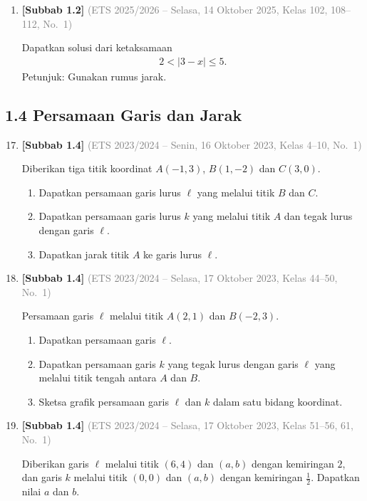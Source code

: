 \documentclass[10pt,openany,a4paper]{article}
\theoremstyle{definition}
\theoremstyle{definition}
\theoremstyle{plain}
\begin{document}
\begin{enumerate}
    \item \textbf{[Subbab 1.2]} {\footnotesize\textcolor{gray}{(ETS 2025/2026 -- Selasa, 14 Oktober 2025, Kelas 102, 108--112, No.~1)}}\par
    Dapatkan solusi dari ketaksamaan
    \begin{align*}
        2<|3-x|\leq 5.
    \end{align*}
    Petunjuk: Gunakan rumus jarak.

\end{enumerate}
\subsection*{1.4 \quad Persamaan Garis dan Jarak}
\begin{enumerate}
\setcounter{enumi}{16}
    \item \textbf{[Subbab 1.4]} {\footnotesize\textcolor{gray}{(ETS 2023/2024 -- Senin, 16 Oktober 2023, Kelas 4--10, No.~1)}}\par
    Diberikan tiga titik koordinat $A(-1,3)$, $B(1,-2)$ dan $C(3,0)$.
    \begin{enumerate}
        \item Dapatkan persamaan garis lurus $\ell$ yang melalui titik $B$ dan $C$.
        \item Dapatkan persamaan garis lurus $k$ yang melalui titik $A$ dan tegak lurus dengan garis $\ell$.
        \item Dapatkan jarak titik $A$ ke garis lurus $\ell$.
    \end{enumerate}

    \item \textbf{[Subbab 1.4]} {\footnotesize\textcolor{gray}{(ETS 2023/2024 -- Selasa, 17 Oktober 2023, Kelas 44--50, No.~1)}}\par
    Persamaan garis $\ell$ melalui titik $A(2,1)$ dan $B(-2,3)$.
    \begin{enumerate}
        \item Dapatkan persamaan garis $\ell$.
        \item Dapatkan persamaan garis $k$ yang tegak lurus dengan garis $\ell$ yang melalui titik tengah antara $A$ dan $B$.
        \item Sketsa grafik persamaan garis $\ell$ dan $k$ dalam satu bidang koordinat.
    \end{enumerate}

    \item \textbf{[Subbab 1.4]} {\footnotesize\textcolor{gray}{(ETS 2023/2024 -- Selasa, 17 Oktober 2023, Kelas 51--56, 61, No.~1)}}\par
    Diberikan garis $\ell$ melalui titik $(6,4)$ dan $(a,b)$ dengan kemiringan $2$, dan garis $k$ melalui titik $(0,0)$ dan $(a,b)$ dengan kemiringan $\frac{1}{2}$. Dapatkan nilai $a$ dan $b$.


\end{enumerate}
\end{document}
